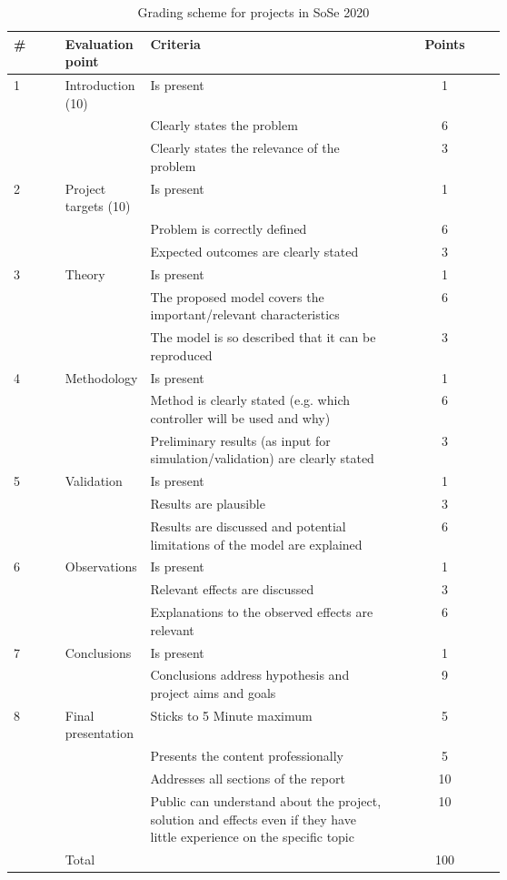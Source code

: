	\begin{table}[h]
		\caption{Grading scheme for projects in SoSe 2020}\label{tbl:grading}
		\centering
		\begin{tabular}{l p{0.13\linewidth} p{0.5\linewidth} c}
			\hline
			\bfseries \# & \bfseries Evaluation point & \bfseries Criteria & \bfseries Points \\
			\hline
			1 & Introduction (10) & Is present & 1 \\
			\cline{3-4}
			 & & Clearly states the problem & 6 \\
			 \cline{3-4}
			 & & Clearly states the relevance of the problem & 3\\
			 \hline
			 2 & Project targets (10) & Is present & 1 \\
			 \cline{3-4}
			 & & Problem is correctly defined & 6 \\
			\cline{3-4}
			 & & Expected outcomes are clearly stated & 3 \\
			 \hline
			 3 & Theory & Is present & 1 \\
			\cline{3-4}
			 & & The proposed model covers the important/relevant characteristics & 6 \\
			\cline{3-4}
			 & & The model is so described that it can be reproduced & 3\\
			 \hline
			 4 & Methodology & Is present & 1 \\
			\cline{3-4}
			 & & Method is clearly stated (e.g. which controller will be used and why) & 6 \\
			\cline{3-4}
			 & & Preliminary results (as input for simulation/validation) are clearly stated & 3\\
			 \hline
			 5 & Validation & Is present & 1 \\
			\cline{3-4}
			  & & Results are plausible & 3\\
			\cline{3-4}
			  & & Results are discussed and potential limitations of the model are explained & 6\\
			 \hline
			 6 & Observations & Is present & 1\\
			\cline{3-4}
			& & Relevant effects are discussed & 3\\
			\cline{3-4}
			& & Explanations to the observed effects are relevant & 6\\
			\hline
			7 & Conclusions & Is present & 1 \\
			\cline{3-4}
			& & Conclusions address hypothesis and project aims and goals & 9 \\
			\hline
			8 & Final presentation & Sticks to 5 Minute maximum & 5 \\
			\cline{3-4}
			&& Presents the content professionally & 5\\
			\cline{3-4}
			&& Addresses all sections of the report & 10 \\
			\cline{3-4}
			&& Public can understand about the project, solution and effects even if they have little experience on the specific topic & 10\\
			\hline
			\hline
			 & Total & & 100 \\
		\end{tabular}
	\end{table}

